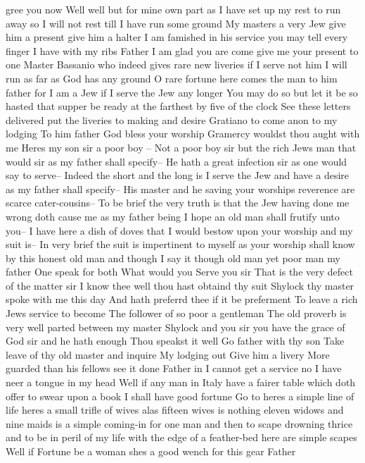 gree you now
Well well but for mine own part as I have set
up my rest to run away so I will not rest till I
have run some ground My masters a very Jew give
him a present give him a halter I am famished in
his service you may tell every finger I have with
my ribs Father I am glad you are come give me
your present to one Master Bassanio who indeed
gives rare new liveries if I serve not him I
will run as far as God has any ground O rare
fortune here comes the man to him father for I
am a Jew if I serve the Jew any longer
You may do so but let it be so hasted that supper
be ready at the farthest by five of the clock See
these letters delivered put the liveries to making
and desire Gratiano to come anon to my lodging
To him father
God bless your worship
Gramercy wouldst thou aught with me
Heres my son sir a poor boy --
Not a poor boy sir but the rich Jews man that
would sir as my father shall specify--
He hath a great infection sir as one would say to serve--
Indeed the short and the long is I serve the Jew
and have a desire as my father shall specify--
His master and he saving your worships reverence
are scarce cater-cousins--
To be brief the very truth is that the Jew having
done me wrong doth cause me as my father being I
hope an old man shall frutify unto you--
I have here a dish of doves that I would bestow upon
your worship and my suit is--
In very brief the suit is impertinent to myself as
your worship shall know by this honest old man and
though I say it though old man yet poor man my father
One speak for both What would you
Serve you sir
That is the very defect of the matter sir
I know thee well thou hast obtaind thy suit
Shylock thy master spoke with me this day
And hath preferrd thee if it be preferment
To leave a rich Jews service to become
The follower of so poor a gentleman
The old proverb is very well parted between my
master Shylock and you sir you have the grace of
God sir and he hath enough
Thou speakst it well Go father with thy son
Take leave of thy old master and inquire
My lodging out Give him a livery
More guarded than his fellows see it done
Father in I cannot get a service no I have
neer a tongue in my head Well if any man in
Italy have a fairer table which doth offer to swear
upon a book I shall have good fortune Go to
heres a simple line of life heres a small trifle
of wives alas fifteen wives is nothing eleven
widows and nine maids is a simple coming-in for one
man and then to scape drowning thrice and to be
in peril of my life with the edge of a feather-bed
here are simple scapes Well if Fortune be a
woman shes a good wench for this gear Father
